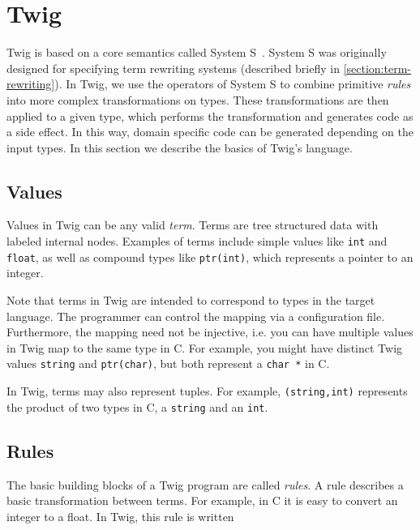 
\section{Twig}


Twig is based on a core semantics called System S~\cite{Visser:1998p333}.
System S was originally designed for specifying term rewriting systems
(described briefly in \ref{section:term-rewriting}). In Twig, we use the
operators of System S to combine primitive \emph{rules} into more complex
transformations on types. These transformations are then applied to a given
type, which performs the transformation and generates code as a side effect.
In this way, domain specific code can be generated depending on the input
types. In this section we describe the basics of Twig's language.

\subsection{Values}

Values in Twig can be any valid \emph{term}. Terms are tree structured data
with labeled internal nodes. Examples of terms include simple values like
\texttt{int} and \texttt{float}, as well as compound types like
\texttt{ptr(int)}, which represents a pointer to an integer.

Note that terms in Twig are intended to correspond to types in the target
language. The programmer can control the mapping via a configuration file.
Furthermore, the mapping need not be injective, i.e. you can have multiple
values in Twig map to the same type in C. For example, you might have distinct
Twig values \texttt{string} and \texttt{ptr(char)}, but both represent a
\texttt{char *} in C. 

In Twig, terms may also represent tuples. For example, \texttt{(string,int)}
represents the product of two types in C, a \texttt{string} and an
\texttt{int}.

\subsection{Rules}

The basic building blocks of a Twig program are called \emph{rules}. A rule
describes a basic transformation between terms. For example, in C it is easy
to convert an integer to a float. In Twig, this rule is written

